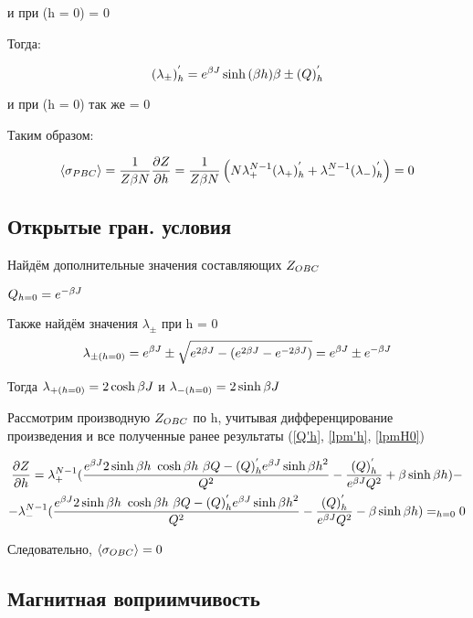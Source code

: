 и при (h = 0) = 0

Тогда:

\begin{equation}\label{lpm'h}
    (\lambda_{\pm})^{'}_{h} = e^{\beta J}  \sinh{(\beta h)} \beta \pm (Q)^{'}_{h}
\end{equation}

и при (h = 0) так же = 0

Таким образом: 

\begin{equation}\label{MeanMagnH0PBC}
    \langle\sigma_{PBC}\rangle = \frac{1}{Z  \beta  N}  \frac{\partial Z}{\partial h} = \frac{1}{Z  \beta  N}  \left( N  \lambda^{N-1}_{+}(\lambda_{+})^{'}_{h} +   \lambda^{N-1}_{-}(\lambda_{-})^{'}_{h}\right) = 0
\end{equation}

\subsection{Открытые гран. условия}

Найдём дополнительные значения составляющих $Z_{OBC}$

$Q_{h = 0} = e^{-\beta J}$

Также найдём значения $\lambda_{\pm}$ при h = 0
\begin{equation}\label{lpmH0}
    \lambda_{\pm (h=0)} = e^{\beta J} \pm \sqrt{e^{2\beta J} - \left( e^{2\beta J} - e^{-2\beta J} \right)} = e^{\beta J} \pm e^{-\beta J}
\end{equation}

Тогда $ \lambda_{+ (h = 0)} = 2\cosh{\beta J} $ и $ \lambda_{- (h = 0)} = 2\sinh{\beta J} $

Рассмотрим производную $Z_{OBC}$ по h, учитывая дифференцирование произведения и все полученные ранее результаты (\eqref{Q'h}, \eqref{lpm'h}, \eqref{lpmH0})

\begin{multline}\label{Zobc'h}
    \frac{\partial Z}{\partial h} = \lp^{N-1}(\frac{e^{\bj}2\sinh{\bh}\ \cosh{\bh}\ \beta Q - (Q)^{'}_{h}e^{\bj}\sinh{\bh}^{2}}{Q^{2}} - \frac{(Q)^{'}_{h}}{e^{\bj}Q^{2}} + \beta\sinh{\bh}) - 
    \\
    - \lm^{N-1}(\frac{e^{\bj}2\sinh{\bh}\ \cosh{\bh}\ \beta Q - (Q)^{'}_{h}e^{\bj}\sinh{\bh}^{2}}{Q^{2}} - \frac{(Q)^{'}_{h}}{e^{\bj}Q^{2}} - \beta\sinh{\bh}) =_{h=0} 0
\end{multline} 

Следовательно, $ \langle\sigma_{OBC}\rangle = 0 $


\subsection{Магнитная воприимчивость}

